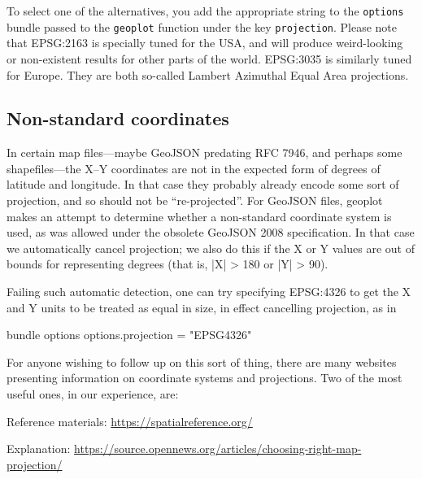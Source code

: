 \documentclass{article}
\begin{document}
To select one of the alternatives, you add the appropriate string to
the \texttt{options} bundle passed to the \texttt{geoplot} function
under the key \texttt{projection}. Please note that \textsf{EPSG:2163}
is specially tuned for the USA, and will produce weird-looking or
non-existent results for other parts of the world. \textsf{EPSG:3035}
is similarly tuned for Europe. They are both so-called Lambert
Azimuthal Equal Area projections.

\subsection*{Non-standard coordinates}

In certain map files---maybe GeoJSON predating RFC 7946, and perhaps
some shapefiles---the X--Y coordinates are not in the expected form of
degrees of latitude and longitude. In that case they probably already
encode some sort of projection, and so should not be ``re-projected''.
For GeoJSON files, \textsf{geoplot} makes an attempt to determine
whether a non-standard coordinate system is used, as was allowed under
the obsolete GeoJSON 2008 specification. In that case we automatically
cancel projection; we also do this if the X or Y values are out of
bounds for representing degrees (that is, |X| > 180 or |Y| > 90).

Failing such automatic detection, one can try specifying
\textsf{EPSG:4326} to get the X and Y units to be treated as equal in
size, in effect cancelling projection, as in
\begin{code}
bundle options
options.projection = "EPSG4326"
\end{code}

For anyone wishing to follow up on this sort of thing, there are many
websites presenting information on coordinate systems and
projections. Two of the most useful ones, in our experience, are:

Reference materials: \url{https://spatialreference.org/}

Explanation: \url{https://source.opennews.org/articles/choosing-right-map-projection/}
\end{document}
